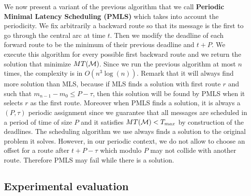 \documentclass[10pt, conference, letterpaper]{IEEEtran}
\begin{document}
     We now present a variant of the previous algorithm that we call {\bf Periodic Minimal Latency Scheduling (PMLS)}
     which takes into account the periodicity. We fix arbitrarily a backward route so that its message is the first to go through the central arc at time $t$. Then we modify the deadline of each forward route to be the minimum of their previous deadline and $t + P$.  We execute this algorithm for every possible first backward route and we return the solution that minimize $MT({\cal M})$. Since we run the previous algorithm at most $n$ times, the complexity is in $O(n^3\log(n))$. Remark that it will always find more solution than MLS,
     because if MLS finds a solution with first route $r$ and such that $m_{n-1} - m_0 \leq P -\tau$, then this solution will be found by PMLS when it selects $r$ as the first route. Moreover when PMLS finds a solution, it is always a $(P,\tau)$ periodic assignment
     since we guarantee that all messages are scheduled in a period of time of size $P$ and it satisfies $MT({\cal M}) < T_{max}$ by construction of the deadlines. The scheduling algorithm we use always finds a solution to the  original problem it solves. However, in our periodic context, we do not allow to choose an offset for a route after $t+P- \tau$ which modulo $P$ may not collide with another route. Therefore PMLS may fail while there is a solution.
     
%   
%     
% 
%     
% 
% 
    
    \subsection{Experimental evaluation}
    \label{sec:resultsPALL}
    
\end{document}
